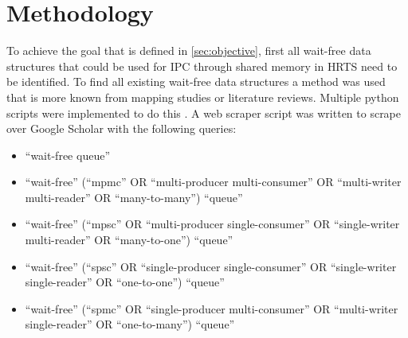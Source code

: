 \chapter{Methodology}\label{ch:methodology}
To achieve the goal that is defined in \cref{sec:objective}, first all wait-free data structures that could be used for \ac{IPC} through shared memory in \ac{HRTS} need to be identified. To find all existing wait-free data structures a method was used that is more known from mapping studies or literature reviews. Multiple python scripts were implemented to do this \cite{githubMA}. A web scraper script was written to scrape over Google Scholar with the following queries:
\begin{itemize}
   \item \enquote{wait-free queue}
   \item \enquote{wait-free} (\enquote{mpmc} OR \enquote{multi-producer multi-consumer} OR \enquote{multi-writer multi-reader} OR \enquote{many-to-many}) \enquote{queue}
   \item \enquote{wait-free} (\enquote{mpsc} OR \enquote{multi-producer single-consumer} OR \enquote{single-writer multi-reader} OR \enquote{many-to-one}) \enquote{queue}
   \item \enquote{wait-free} (\enquote{spsc} OR \enquote{single-producer single-consumer} OR \enquote{single-writer single-reader} OR \enquote{one-to-one}) \enquote{queue}
   \item \enquote{wait-free} (\enquote{spmc} OR \enquote{single-producer multi-consumer} OR \enquote{multi-writer single-reader} OR \enquote{one-to-many}) \enquote{queue}
\end{itemize}
